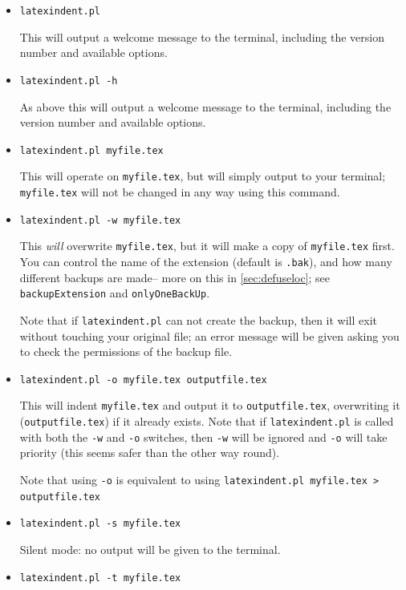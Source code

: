\documentclass[11pt]{article}
\newcommand{\verbitem}[1]{\small\PVerb{#1}}
\begin{document}
\begin{itemize}[labelsep=.25cm]
	\item[] \lstinline!latexindent.pl!

	      This will output a welcome message to the terminal, including the version number
	      and available options.
	\item[\verbitem{-h, --help}] \lstinline!latexindent.pl -h!

	      As above this will output a welcome message to the terminal, including the version number
	      and available options.
	\item[] \lstinline!latexindent.pl myfile.tex!

	      This will operate on \lstinline!myfile.tex!, but will simply output to your terminal; \lstinline!myfile.tex! will	not be changed in any way using this command.
	\item[\verbitem{-w, --overwrite}] \lstinline!latexindent.pl -w myfile.tex!

	      This \emph{will} overwrite \lstinline!myfile.tex!, but it will
	      make a copy of \lstinline!myfile.tex! first. You can control the name of
	      the extension (default is \lstinline!.bak!), and how many different backups are made--
	      more on this in \cref{sec:defuseloc}; see \lstinline!backupExtension! and \lstinline!onlyOneBackUp!.

	      Note that if \lstinline!latexindent.pl! can not create the backup, then it
	      will exit without touching your original file; an error message will be given
	      asking you to check the permissions of the backup file.
	\item[\verbitem{-o,--outputfile}] \lstinline!latexindent.pl -o myfile.tex outputfile.tex!

	      This will indent \lstinline!myfile.tex! and output it to \lstinline!outputfile.tex!,
	      overwriting it (\lstinline!outputfile.tex!) if it already exists. Note that if \lstinline!latexindent.pl! is called with both
	      the \lstinline!-w! and \lstinline!-o! switches, then \lstinline!-w! will
	      be ignored and \lstinline!-o! will take priority (this seems safer than the
	      other way round).

	      Note that using \lstinline!-o! is equivalent to using \lstinline!latexindent.pl myfile.tex > outputfile.tex!
	\item[\verbitem{-s, --silent}] \lstinline!latexindent.pl -s myfile.tex!

	      Silent mode: no output will be given to the terminal.
	\item[\verbitem{-t, --trace}] \lstinline!latexindent.pl -t myfile.tex!


\end{itemize}
\end{document}
